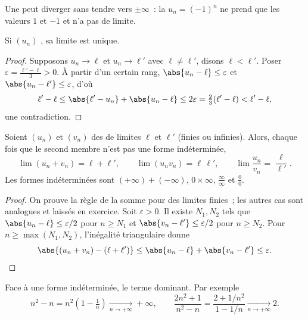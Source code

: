 \begin{remark}
Une  peut diverger sans tendre vers $\pm\infty$~: la 
$u_n = (-1)^n$ ne prend que les valeurs $1$ et $-1$ et n'a pas de limite.
\end{remark}

\begin{proposition}\label{prop:g12:seq:uniqueness}
Si $(u_n)$ , sa limite est unique.
\end{proposition}

\begin{proof}
Supposons $u_n \to \ell$ et $u_n \to \ell'$ avec $\ell \neq \ell'$, disons
$\ell < \ell'$. Poser $\varepsilon = \frac{\ell' - \ell}{3} > 0$. À partir
d'un certain rang, $\abs{u_n - \ell} \leq \varepsilon$ et
$\abs{u_n - \ell'} \leq \varepsilon$, d'où
\[
\ell' - \ell \leq \abs{\ell' - u_n} + \abs{u_n - \ell}
\leq 2\varepsilon = \tfrac{2}{3}(\ell' - \ell) < \ell' - \ell,
\]
une contradiction.
\end{proof}

\begin{proposition}\label{prop:g12:seq:operations}
Soient $(u_n)$ et $(v_n)$ des  de limites $\ell$ et $\ell'$ (finies
ou infinies). Alors, chaque fois que le second membre n'est pas une forme
indéterminée,
\[
\lim (u_n + v_n) = \ell + \ell', \qquad
\lim (u_n v_n) = \ell\,\ell', \qquad
\lim \frac{u_n}{v_n} = \frac{\ell}{\ell'}.
\]
Les formes indéterminées sont
$(+\infty) + (-\infty)$, $0 \times \infty$, $\frac{\infty}{\infty}$ et
$\frac{0}{0}$.
\end{proposition}

\begin{proof}
On prouve la règle de la somme pour des limites finies~; les autres cas
sont analogues et laissés en exercice. Soit $\varepsilon > 0$. Il existe
$N_1, N_2$ tels que $\abs{u_n - \ell} \leq \varepsilon/2$ pour
$n \geq N_1$ et $\abs{v_n - \ell'} \leq \varepsilon/2$ pour
$n \geq N_2$. Pour $n \geq \max(N_1, N_2)$, l'inégalité triangulaire donne
\[
\abs{(u_n + v_n) - (\ell + \ell')}
\leq \abs{u_n - \ell} + \abs{v_n - \ell'} \leq \varepsilon. \qedhere
\]
\end{proof}

\begin{method}\label{met:g12:seq:indeterminate}
Face à une forme indéterminée,  le terme dominant. Par exemple
\[
n^2 - n = n^2\left(1 - \tfrac{1}{n}\right) \xrightarrow[n\to+\infty]{} +\infty,
\qquad
\frac{2n^2+1}{n^2 - n} = \frac{2 + 1/n^2}{1 - 1/n}
\xrightarrow[n\to+\infty]{} 2 .
\]
\end{method}


